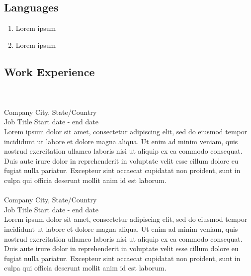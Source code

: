 \documentclass[11pt, oneside, letterpaper, titlepage]{article}
\begin{document}
\begin{tcolorbox}
\begin{minipage}[t]{3in}
\begin{tcolorbox}[colframe=secondary,colback=secondary,arc=0mm]
			\section*{Languages}
			\vspace*{-0.2in}
			\hrulefill
			\begin{enumerate}[\indent {}]
				\item Lorem ipsum
				\item Lorem ipsum
			\end{enumerate}
		\end{tcolorbox}
	\end{minipage}
	\begin{minipage}[t]{5.25in}
		\vspace*{-0.125in}
		\begin{tcolorbox}[colframe=white,colback=white,arc=0mm]
			\section*{Work Experience}
			\vspace*{-0.2in}
			\hrulefill\\\\
			Company \hfill City, State/Country \\
			Job Title \hfill Start date - end date \\
			Lorem ipsum dolor sit amet, consectetur adipiscing elit, sed do eiusmod tempor incididunt ut labore et dolore magna aliqua. Ut enim ad minim veniam, quis nostrud exercitation ullamco laboris nisi ut aliquip ex ea commodo consequat. Duis aute irure dolor in reprehenderit in voluptate velit esse cillum dolore eu fugiat nulla pariatur. Excepteur sint occaecat cupidatat non proident, sunt in culpa qui officia deserunt mollit anim id est laborum.\\\\
			Company \hfill City, State/Country \\
			Job Title \hfill Start date - end date \\
			Lorem ipsum dolor sit amet, consectetur adipiscing elit, sed do eiusmod tempor incididunt ut labore et dolore magna aliqua. Ut enim ad minim veniam, quis nostrud exercitation ullamco laboris nisi ut aliquip ex ea commodo consequat. Duis aute irure dolor in reprehenderit in voluptate velit esse cillum dolore eu fugiat nulla pariatur. Excepteur sint occaecat cupidatat non proident, sunt in culpa qui officia deserunt mollit anim id est laborum.			

\end{tcolorbox}
\end{minipage}
\end{tcolorbox}
\end{document}
